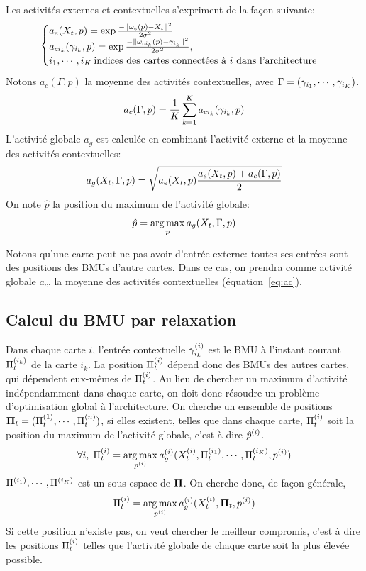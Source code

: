 \documentclass[../main]{subfiles}
\begin{document}
Les activités externes et contextuelles s'expriment de la façon suivante:
\begin{equation}
\label{eq:activite}
\begin{cases}
a_e(X_t,p) = \exp\frac{-\lVert \omega_e(p)-X_t \rVert^2}{2\sigma^2} \\
a_{ci_k}(\gamma_{i_k},p) = \exp\frac{-\lVert \omega_{ci_k}(p)-\gamma_{i_k} \rVert ^2}{2\sigma^2}, \\
i_1, \cdots, i_K\: \text{indices des cartes connectées à $i$ dans l'architecture}
\end{cases}
\end{equation}
Notons $a_c(\Gamma,p)$ la moyenne des activités contextuelles, avec $\Gamma = (\gamma_{i_1}, \cdots, \gamma_{i_K})$.
\begin{equation}\label{eq:ac}
a_c(\Gamma,p) = \frac{1}{K}\sum_{k=1}^K {a_{ci_k}(\gamma_{i_k},p)}
\end{equation}
L'activité globale $a_g$ est calculée en combinant l'activité externe et la moyenne des activités contextuelles:
\begin{equation}
\label{eq:global_act}
a_g(X_t,\Gamma,p) = \sqrt{a_e(X_t,p) \frac{a_e(X_t,p) +  a_c(\Gamma,p)}{2}}
\end{equation} 
On note $\hat{p}$ la position du maximum de l'activité globale:
\begin{equation}
\label{argmax}
\hat{p} = \operatorname*{arg\,max}_p a_g(X_t, \Gamma,p)
\end{equation}

Notons qu'une carte peut ne pas avoir d'entrée externe: toutes ses entrées sont des positions des BMUs d'autre cartes. Dans ce cas, on prendra comme activité globale $a_c$, la moyenne des activités contextuelles (équation~\ref{eq:ac}).

\subsection{Calcul du BMU par relaxation}\label{sec:relax}

Dans chaque carte $i$, l'entrée contextuelle $\gamma^{({i})}_{i_k}$ est le BMU à l'instant courant $\Pi^{({i_k})}_t$  de la carte $i_k$. La position $\Pi^{({i})}_t$ dépend donc des BMUs des autres cartes, qui dépendent eux-mêmes de $\Pi^{({i})}_t$. Au lieu de chercher un maximum d'activité indépendamment dans chaque carte, on doit donc résoudre un problème d'optimisation global à l'architecture. 
On cherche un ensemble de positions $\mathbf{\Pi}_t = (\Pi^{({1})}_t, \cdots, \Pi^{({n})}_t)$, si elles existent, telles que dans chaque carte, $\Pi^{({i})}_t$ soit la position du maximum de l'activité globale, c'est-à-dire $\hat{p}^{({i})}$.
\begin{equation}
\forall i, \; \Pi^{({i})}_t = \operatorname*{arg\,max}_{p^{({i})}} a_g^{({i})}(X^{({i})}_t, \Pi^{({i_1})}_t, \cdots, \Pi^{({i_K})}_t,p^{({i})})
\end{equation}
$\Pi^{({i_1})}, \cdots, \Pi^{({i_K})}$ est un sous-espace de $\mathbf{\Pi}$. On cherche donc, de façon générale, $$\Pi^{({i})}_t = \operatorname*{arg\,max}_{p^{({i})}} a_g^{({i})}(X^{({i})}_t, \mathbf{\Pi}_t, p^{({i})})$$
Si cette position n'existe pas, on veut chercher le meilleur compromis, c'est à dire les positions $\Pi^{({i})}_t$ telles que l'activité globale de chaque carte soit la plus élevée possible.
\end{document}
